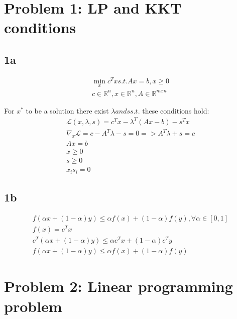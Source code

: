 \section{Problem 1: LP and KKT conditions}

\subsection{1a}
\begin{subequations}
    \begin{align}
        \min_x c^T x s.t. Ax=b, x\geq 0 \\ 
        c \in \mathbb{R}^n, x \in \mathbb{R}^n, A \in \mathbb{R}^{mxn}
    \end{align}
\end{subequations}

For $x^*$ to be a solution there exist $\lambda and s s.t.$ these conditions hold: 
\begin{subequations}
    \begin{align}
        \mathcal{L}(x,\lambda,s) = c^T x - \lambda^T(Ax-b)-s^T x \\ 
        \nabla_x \mathcal{L} = c - A^T \lambda -s = 0=> A^T \lambda + s = c \\ 
        Ax = b \\ 
        x \geq 0 \\ 
        s \geq 0 \\ 
        x_i s_i = 0
    \end{align}
\end{subequations}
\subsection{1b}
\begin{subequations}
    \begin{align}
        f(\alpha x + (1-\alpha)y) \leq \alpha f(x)+(1-\alpha)f(y) , \forall \alpha \in [0,1] \\ 
        f(x) = c^T x \\ 
        c^T (\alpha x + (1-\alpha)y) \leq \alpha c^T x+(1-\alpha)c^Ty \\ 
        f(\alpha x + (1-\alpha)y) \leq \alpha f(x)+(1-\alpha)f(y)
    \end{align}
\end{subequations}

\section{Problem 2:  Linear programming problem}
